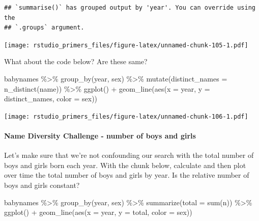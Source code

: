 \documentclass[
]{article}
\newenvironment{Shaded}{\begin{snugshade}}{\end{snugshade}}
\newcommand{\AttributeTok}[1]{\textcolor[rgb]{0.77,0.63,0.00}{#1}}
\newcommand{\FunctionTok}[1]{\textcolor[rgb]{0.00,0.00,0.00}{#1}}
\newcommand{\NormalTok}[1]{#1}
\newcommand{\SpecialCharTok}[1]{\textcolor[rgb]{0.00,0.00,0.00}{#1}}
\begin{document}
\begin{verbatim}
## `summarise()` has grouped output by 'year'. You can override using the
## `.groups` argument.
\end{verbatim}

\texttt{[image: rstudio\_primers\_files/figure-latex/unnamed-chunk-105-1.pdf]}

What about the code below? Are these same?

\begin{Shaded}
\begin{Highlighting}[]
\NormalTok{babynames }\SpecialCharTok{\%\textgreater{}\%}
  \FunctionTok{group\_by}\NormalTok{(year, sex) }\SpecialCharTok{\%\textgreater{}\%}
  \FunctionTok{mutate}\NormalTok{(}\AttributeTok{distinct\_names =} \FunctionTok{n\_distinct}\NormalTok{(name)) }\SpecialCharTok{\%\textgreater{}\%}
  \FunctionTok{ggplot}\NormalTok{() }\SpecialCharTok{+}
    \FunctionTok{geom\_line}\NormalTok{(}\FunctionTok{aes}\NormalTok{(}\AttributeTok{x =}\NormalTok{ year, }\AttributeTok{y =}\NormalTok{ distinct\_names, }\AttributeTok{color =}\NormalTok{ sex))}
\end{Highlighting}
\end{Shaded}

\texttt{[image: rstudio\_primers\_files/figure-latex/unnamed-chunk-106-1.pdf]}

\hypertarget{name-diversity-challenge---number-of-boys-and-girls}{%
\paragraph{Name Diversity Challenge - number of boys and
girls}\label{name-diversity-challenge---number-of-boys-and-girls}}

Let's make sure that we're not confounding our search with the total
number of boys and girls born each year. With the chunk below, calculate
and then plot over time the total number of boys and girls by year. Is
the relative number of boys and girls constant?

\begin{Shaded}
\begin{Highlighting}[]
\NormalTok{babynames }\SpecialCharTok{\%\textgreater{}\%}
  \FunctionTok{group\_by}\NormalTok{(year, sex) }\SpecialCharTok{\%\textgreater{}\%}
  \FunctionTok{summarize}\NormalTok{(}\AttributeTok{total =} \FunctionTok{sum}\NormalTok{(n)) }\SpecialCharTok{\%\textgreater{}\%}
  \FunctionTok{ggplot}\NormalTok{() }\SpecialCharTok{+} 
    \FunctionTok{geom\_line}\NormalTok{(}\FunctionTok{aes}\NormalTok{(}\AttributeTok{x =}\NormalTok{ year, }\AttributeTok{y =}\NormalTok{ total, }\AttributeTok{color =}\NormalTok{ sex))}
\end{Highlighting}
\end{Shaded}
\end{document}
